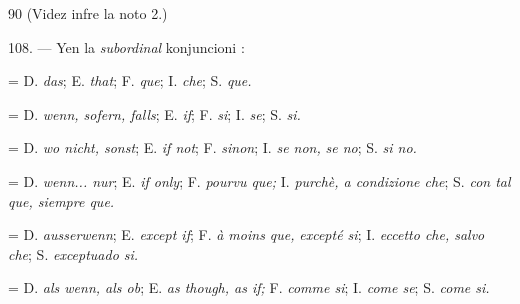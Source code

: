 \begin{VUpage}[94]{90}
 (Videz infre la noto 2.)

\VUblanc{5.64pt}%
108. --- Yen la \textit{subordinal} konjuncioni :

\VUblancAlinea
{} = D. \textit{das}; E. \textit{that}; F. \textit{que}; I. \textit{che}; S. \textit{que.}

 = D. \textit{wenn, sofern, falls}; E. \textit{if}; F. \textit{si}; I. \textit{se}; S. \textit{si.}

 = D. \textit{wo nicht, sonst}; E. \textit{if not}; F. \textit{sinon}; I. \textit{se non,}\nl
\textit{se no}; S. \textit{si no.}

 = D. \textit{wenn... nur}; E. \textit{if only}; F. \textit{pourvu que;}\nl
I. \textit{purchè, a condizione che}; S. \textit{con tal que, siempre que.}

 = D. \textit{ausserwenn}; E. \textit{except if}; F. \textit{à moins que,}\nl
\textit{excepté si}; I. \textit{eccetto che, salvo che}; S. \textit{exceptuado si.}

 = D. \textit{als wenn, als ob}; E. \textit{as though, as if;}\nl
F. \textit{comme si}; I. \textit{come se}; S. \textit{come si.}
\end{VUpage}

